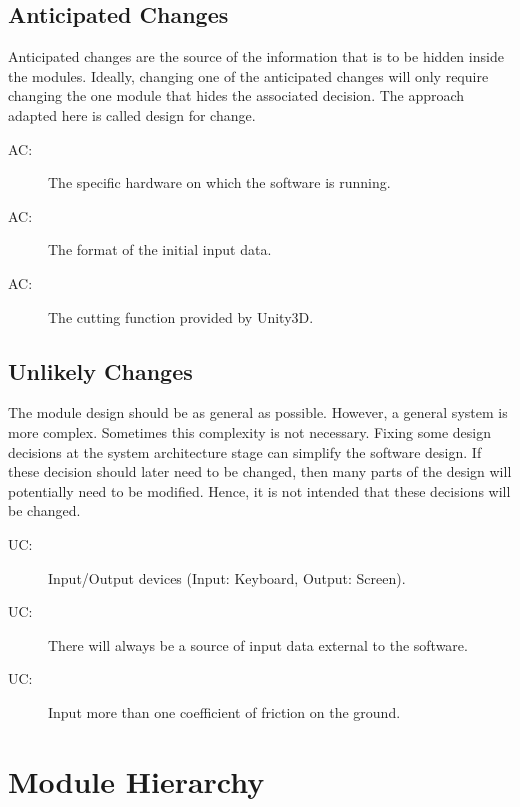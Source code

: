 \documentclass[12pt, titlepage]{article}
\newcounter{acnum}
\newcommand{\actheacnum}{AC\theacnum}
\newcounter{ucnum}
\newcommand{\uctheucnum}{UC\theucnum}
\begin{document}
	\subsection{Anticipated Changes} \label{SecAchange}
	
	Anticipated changes are the source of the information that is to be hidden
	inside the modules. Ideally, changing one of the anticipated changes will only
	require changing the one module that hides the associated decision. The approach
	adapted here is called design for
	change.
	
	\begin{description}
		\item[ \actheacnum \label{acHardware}:] The specific
		hardware on which the software is running.
		\item[ \actheacnum \label{acInput}:] The format of the
		initial input data.
		\item[ \actheacnum \label{acCF}:] The cutting function provided by Unity3D. 
	\end{description}
	
	\subsection{Unlikely Changes} \label{SecUchange}
	
	The module design should be as general as possible. However, a general system is
	more complex. Sometimes this complexity is not necessary. Fixing some design
	decisions at the system architecture stage can simplify the software design. If
	these decision should later need to be changed, then many parts of the design
	will potentially need to be modified. Hence, it is not intended that these
	decisions will be changed.
	
	\begin{description}
		\item[ \uctheucnum \label{ucIO}:] Input/Output devices
		(Input: Keyboard, Output: Screen).
		\item[ \uctheucnum \label{ucInput}:] There will always be
		a source of input data external to the software.
		\item[ \uctheucnum \label{ucFri}:] Input more than one coefficient of friction on the ground.
	\end{description}
	
	\section{Module Hierarchy} \label{SecMH}
	
\end{document}
